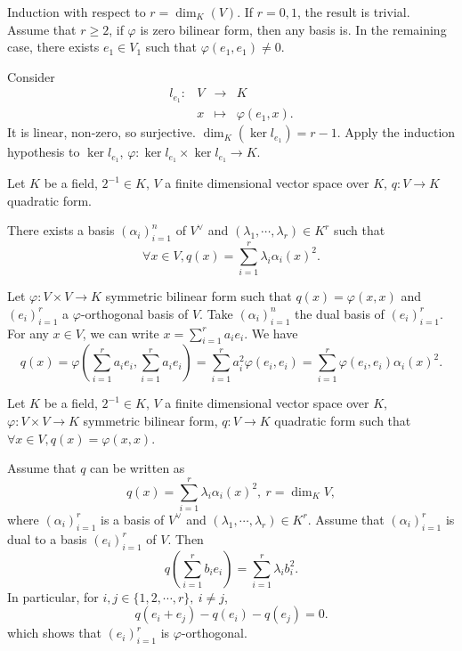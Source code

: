 \begin{proofenv}
    Induction with respect to $r = \dim_{K}(V)$. If $r=0,1$, the result is trivial. Assume that $r \ge 2$, if $\varphi$ is zero bilinear form, then any basis is. In the remaining case, there exists $e_1\in V_1$ such that $\varphi(e_1,e_1) \neq 0$.
    
    Consider
    $$\begin{array}{rrcl}
        l_{e_1} : & V& \rightarrow & K\\ & x &\mapsto &\varphi(e_1,x).
    \end{array}$$
    It is linear, non-zero, so surjective. $\dim_{K}\left(\ker l_{e_1}\right) = r- 1 $. Apply the induction hypothesis to $\ker l_{e_1}$, $\varphi : \ker l_{e_1} \times \ker l_{e_1} \rightarrow K$.
\end{proofenv}
\begin{propositionenv}
    Let $K$ be a field, $2^{-1}\in K$, $V$ a finite dimensional vector space over $K$, $q: V\rightarrow K$ quadratic form.

    \quad There exists a basis $\left(\alpha_i\right)_{i=1}^{n}$ of $V^\vee$ and $\left(\lambda_1,\cdots,\lambda_r\right)\in K^r$ such that
    $$ \forall x\in V, q(x) = \sum_{i=1}^{r} \lambda_i \alpha_i(x)^2.$$
\end{propositionenv}
\begin{proofenv}
    Let $\varphi : V\times V\rightarrow K$ symmetric bilinear form such that $q(x) = \varphi(x,x)$ and $\left(e_i\right)_{i=1}^{r}$ a $\varphi$-orthogonal basis of $V$.
    Take $\left(\alpha_i\right)_{i=1}^{n}$ the dual basis of $\left(e_i\right)_{i=1}^{r}$. 
    For any $x\in V$, we can write $x = \sum_{i=1}^{r} a_i e_i$. We have
    $$ q(x) = \varphi\left(\sum_{i=1}^{r} a_i e_i, \sum_{i=1}^{r} a_i e_i\right) = \sum_{i=1}^{r} a_i^2 \varphi(e_i,e_i) = \sum_{i=1}^{r} \varphi(e_i,e_i) \alpha_i(x)^2.$$
\end{proofenv}
\begin{remark}
    Let $K$ be a field, $2^{-1}\in K$, $V$ a finite dimensional vector space over $K$, $\varphi : V\times V\rightarrow K$ symmetric bilinear form, $q: V\rightarrow K$ quadratic form such that $\forall x\in V, q(x) = \varphi(x,x)$.

    \quad Assume that $q$ can be written as 
    $$ q(x) = \sum_{i=1}^{r} \lambda_i \alpha_i(x)^2,\ r =\dim_{K}V,$$
    where $\left(\alpha_i\right)_{i=1}^{r}$ is a basis of $V^\vee$ and $\left(\lambda_1,\cdots,\lambda_r\right)\in K^r$. 
    Assume that $\left(\alpha_i\right)_{i=1}^{r}$ is dual to a basis $\left(e_i\right)_{i=1}^{r}$ of $V$.
    Then 
    $$ q \left(\sum_{i=1}^{r} b_i e_i\right) = \sum_{i=1}^{r} \lambda_i b_i^2. $$
    In particular, for $i,j \in \{1,2,\cdots,r\},\ i\neq j$,
    $$ q(e_i + e_j) - q(e_i) - q(e_j) = 0.$$
    which shows that $\left(e_i\right)_{i=1}^{r}$ is $\varphi$-orthogonal.
\end{remark}
